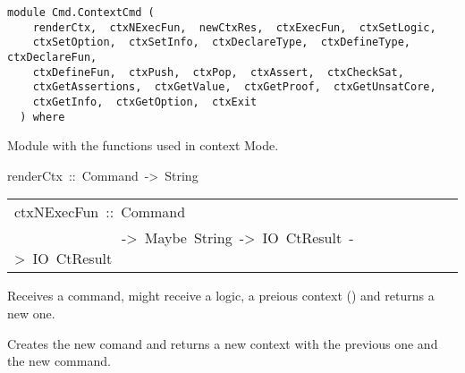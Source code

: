 \label{module:Cmd.ContextCmd}
\haddockbeginheader
{\haddockverb\begin{verbatim}
module Cmd.ContextCmd (
    renderCtx,  ctxNExecFun,  newCtxRes,  ctxExecFun,  ctxSetLogic, 
    ctxSetOption,  ctxSetInfo,  ctxDeclareType,  ctxDefineType,  ctxDeclareFun, 
    ctxDefineFun,  ctxPush,  ctxPop,  ctxAssert,  ctxCheckSat, 
    ctxGetAssertions,  ctxGetValue,  ctxGetProof,  ctxGetUnsatCore, 
    ctxGetInfo,  ctxGetOption,  ctxExit
  ) where\end{verbatim}}
\haddockendheader

Module with the functions used in context Mode.
\par

\begin{haddockdesc}
\item[
renderCtx\ ::\ Command\ ->\ {\char 91}String{\char 93}
]
\end{haddockdesc}
\begin{haddockdesc}
\item[\begin{tabular}{@{}l}
ctxNExecFun\ ::\ Command\\\ \ \ \ \ \ \ \ \ \ \ \ \ \ \ ->\ Maybe\ String\ ->\ IO\ CtResult\ ->\ IO\ CtResult
\end{tabular}]\haddockbegindoc
Receives  a command, might receive a logic, a preious context
() and returns a new one.
\par
Creates the new comand and returns a new context with the previous one and
the new command.
\par

\end{haddockdesc}
